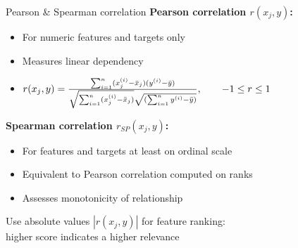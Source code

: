 \documentclass[11pt,compress,t,notes=noshow, xcolor=table]{beamer}
\begin{document}
\begin{vbframe}{Pearson \& Spearman correlation}
\textbf{Pearson correlation $r(x_j, y)$: }
\begin{itemize}
\item For numeric features and targets only
\item Measures linear dependency
\item $ r(x_j, y) = \frac{\sum_{i=1}^n (x^{(i)}_j - \bar{x}_j) (y^{(i)} - \bar{y})}{\sqrt{\sum_{i=1}^n (x^{(i)}_j - \bar{x}_j)} \sqrt{(\sum_{i=1}^n y^{(i)} - \bar{y})}},\qquad -1 \le r \le 1$
\end{itemize}
\vspace{0.4cm}
\textbf{Spearman correlation $r_{SP}(x_j, y)$:}
\begin{itemize}
\item For features and targets at least on ordinal scale
\item Equivalent to Pearson correlation computed on ranks
\item Assesses monotonicity of relationship
%
%
%
\end{itemize}
\lz
Use absolute values $|r(x_j, y)|$ for feature ranking:\\
higher score indicates a higher relevance

\end{vbframe}
\end{document}
